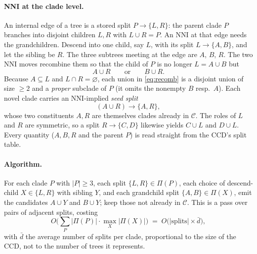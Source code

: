 \documentclass{article}
\newcommand{\CC}{\mathcal{C}}
\newcommand{\union}{\cup}
\begin{document}
\paragraph{NNI at the clade level.}
An internal edge of a tree is a stored split $P\to\{L,R\}$: the parent clade $P$
branches into disjoint children $L,R$ with $L\union R=P$. An NNI at that edge
needs the grandchildren. Descend into one child, say $L$, with its split
$L\to\{A,B\}$, and let the sibling be $R$. The three subtrees meeting at the edge
are $A$, $B$, $R$. The two NNI moves recombine them so that the child of $P$ is no
longer $L=A\union B$ but
\begin{equation}
  A\union R \qquad\text{or}\qquad B\union R .
  \label{eq:recomb}
\end{equation}
Because $A\subseteq L$ and $L\cap R=\varnothing$, each union in
\eqref{eq:recomb} is a disjoint union of size $\ge 2$ and a \emph{proper}
subclade of $P$ (it omits the nonempty $B$ resp.\ $A$). Each novel clade carries
an NNI-implied \emph{seed split}
\[
  (A\union R)\to\{A,R\},
\]
whose two constituents $A,R$ are themselves clades already in $\CC$. The roles of
$L$ and $R$ are symmetric, so a split $R\to\{C,D\}$ likewise yields $C\union L$
and $D\union L$. Every quantity ($A,B,R$ and the parent $P$) is read
straight from the CCD's split table.

\paragraph{Algorithm.}
For each clade $P$ with $|P|\ge 3$, each split $\{L,R\}\in\Pi(P)$, each choice of
descend-child $X\in\{L,R\}$ with sibling $Y$, and each grandchild split
$\{A,B\}\in\Pi(X)$, emit the candidates $A\union Y$ and $B\union Y$; keep those
not already in $\CC$. This is a pass over pairs of adjacent splits, costing
\[
  O\!\Big(\textstyle\sum_{P} |\Pi(P)|\cdot \max_{X}|\Pi(X)|\Big)
  \;=\; O\big(|\text{splits}|\times \bar{d}\big),
\]
with $\bar d$ the average number of splits per clade, proportional to the size
of the CCD, not to the number of trees it represents.
\end{document}
